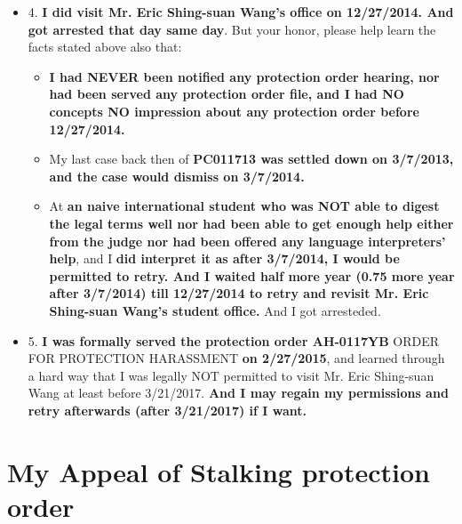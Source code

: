 \documentclass[9pt, b5paper]{article}
\begin{document}
\begin{itemize}
\begin{itemize}
\end{itemize}
\item 4. \textbf{I did visit Mr. Eric Shing-suan Wang's office on 12/27/2014. And got arrested that day same day}. But your honor, please help learn the facts stated above also that: 
\begin{itemize}
\item \textbf{I had NEVER been notified any protection order hearing, nor had been served any protection order file, and I had NO concepts NO impression about any protection order before 12/27/2014.}
\item My last case back then of \textbf{PC011713 was settled down on 3/7/2013, and the case would dismiss on 3/7/2014.}
\item At \textbf{an naive international student who was NOT able to digest the legal terms well nor had been able to get enough help either from the judge nor had been offered any language interpreters' help}, and I \textbf{did interpret it as after 3/7/2014, I would be permitted to retry. And I waited half more year (0.75 more year after 3/7/2014) till 12/27/2014 to retry and revisit Mr. Eric Shing-suan Wang's student office.} And I got arresteded.
\end{itemize}
\item 5. \textbf{I was formally served the protection order AH-0117YB} ORDER FOR PROTECTION HARASSMENT \textbf{on 2/27/2015}, and learned through a hard way that I was legally NOT permitted to visit Mr. Eric Shing-suan Wang at least before 3/21/2017. \textbf{And I may regain my permissions and retry afterwards (after 3/21/2017) if I want.}
\end{itemize}

\section{My Appeal of Stalking protection order}
\label{sec-5}
\end{document}
